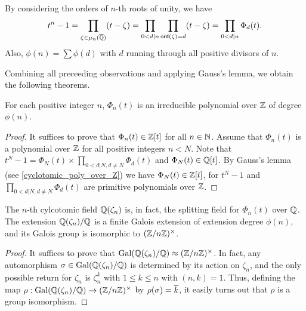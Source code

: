 \begin{obs}
    By considering the orders of $n$-th roots of unity, we have
    \begin{align*}
        t^n-1=\prod_{\zeta\in\mu_n(\overline{{\mathbb{Q}}})}(t-\zeta)=\prod_{0<d|n}\prod_{\textsf{ord}(\zeta)=d}(t-\zeta)=\prod_{0<d|n}\Phi_d(t).
    \end{align*}
    Also, $\phi(n)=\sum\phi(d)$ with $d$ running through all positive divisors of $n$.
\end{obs}
Combining all preceeding observations and applying Gauss's lemma, we obtain the following theorems.
\begin{thm}
    For each positive integer $n$, $\Phi_n(t)$ is an irreducible polynomial over ${\mathbb{Z}}$ of degree $\phi(n)$.
\end{thm}
\begin{proof}
    It suffices to prove that $\Phi_n(t)\in{\mathbb{Z}}[t]$ for all $n\in{\mathbb{N}}$.
    Assume that $\Phi_n(t)$ is a polynomial over ${\mathbb{Z}}$ for all positive integers $n<N$.
    Note that $t^N-1=\Phi_N(t)\times\prod_{0<d|N, d\neq N}\Phi_d(t)$ and $\Phi_N(t)\in{\mathbb{Q}}[t]$.
    By Gauss's lemma (see \cref{cyclotomic_poly_over_Z}) we have $\Phi_N(t)\in{\mathbb{Z}}[t]$, for $t^N-1$ and $\prod_{0<d|N, d\neq N}\Phi_d(t)$ are primitive polynomials over ${\mathbb{Z}}$.
\end{proof}
\begin{thm}
    The $n$-th cylcotomic field ${\mathbb{Q}}(\zeta_n)$ is, in fact, the splitting field for $\Phi_n(t)$ over ${\mathbb{Q}}$.
    The extension ${\mathbb{Q}}(\zeta_n)/{\mathbb{Q}}$ is a finite Galois extension of extension degree $\phi(n)$, and its Galois group is isomorphic to $({\mathbb{Z}}/n{\mathbb{Z}})^\times$.
\end{thm}
\begin{proof}
    It suffices to prove that ${\textrm{Gal}({{\mathbb{Q}}(\zeta_n)/{\mathbb{Q}}})}\approx({\mathbb{Z}}/n{\mathbb{Z}})^\times$.
    In fact, any automorphism $\sigma\in{\textrm{Gal}({{\mathbb{Q}}(\zeta_n)/{\mathbb{Q}}})}$ is determined by its action on $\zeta_n$, and the only possible return for $\zeta_n$ is $\zeta_n^k$ with $1\leq k\leq n$ with $(n, k)=1$.
    Thus, defining the map $\rho: {\textrm{Gal}({{\mathbb{Q}}(\zeta_n)/{\mathbb{Q}}})}\rightarrow({\mathbb{Z}}/n{\mathbb{Z}})^\times$ by $\rho(\sigma)=\overline{k}$, it easily turns out that $\rho$ is a group isomorphism.
\end{proof}

